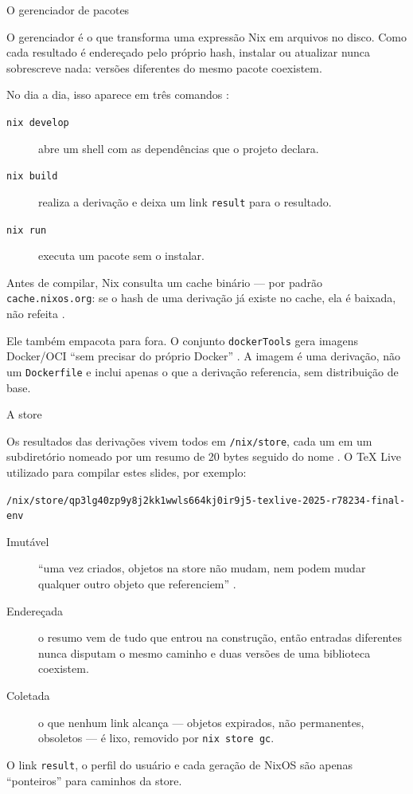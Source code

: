 \documentclass{beamer}
\newcommand{\termo}[1]{\alert{#1}}
\newcommand{\code}[1]{\texttt{#1}}
\begin{document}
\begin{frame}{O gerenciador de pacotes}
	\small\raggedright
	O gerenciador é o que transforma uma expressão Nix em arquivos no disco. Como cada resultado é endereçado pelo próprio hash, instalar ou atualizar nunca sobrescreve nada: versões diferentes do mesmo pacote coexistem.

	\smallskip
	No dia a dia, isso aparece em três comandos \cite{nixmanual}:

	\begin{description}
		\item[\code{nix develop}] abre um shell com as dependências que o projeto declara.
		\item[\code{nix build}] realiza a derivação e deixa um link \code{result} para o resultado.
		\item[\code{nix run}] executa um pacote sem o instalar.
	\end{description}

	\medskip
	Antes de compilar, Nix consulta um \termo{cache binário} --- por padrão \code{cache.nixos.org}: se o hash de uma derivação já existe no cache, ela é baixada, não refeita \cite{nixmanual}.

	\medskip
	Ele também empacota para fora. O conjunto \code{dockerTools} gera imagens Docker/OCI \enquote{sem precisar do próprio Docker} \cite{nixpkgs-manual}. A imagem é uma derivação, não um \code{Dockerfile} e inclui apenas o que a derivação referencia, sem distribuição de base.
\end{frame}

\begin{frame}{A store}
	\raggedright
	Os resultados das derivações vivem todos em \code{/nix/store}, cada um em um subdiretório nomeado por um resumo de 20 bytes seguido do nome \cite{nixmanual}. O TeX Live utilizado para compilar estes slides, por exemplo:

	\smallskip
	{\scriptsize\code{/nix/store/qp3lg40zp9y8j2kk1wwls664kj0ir9j5-texlive-2025-r78234-final-env}}

	\smallskip
	\begin{description}
		\item[Imutável] \enquote{uma vez criados, objetos na store não mudam, nem podem mudar qualquer outro objeto que referenciem} \cite{nixmanual}.
		\item[Endereçada] o resumo vem de tudo que entrou na construção, então entradas diferentes nunca disputam o mesmo caminho e duas versões de uma biblioteca coexistem.
		\item[Coletada] o que nenhum link alcança --- objetos expirados, não permanentes, obsoletos --- é lixo, removido por \mbox{\code{nix store gc}}.
	\end{description}

	\smallskip
	O link \code{result}, o perfil do usuário e cada geração de NixOS são apenas \enquote{ponteiros} para caminhos da store.
\end{frame}
\end{document}
